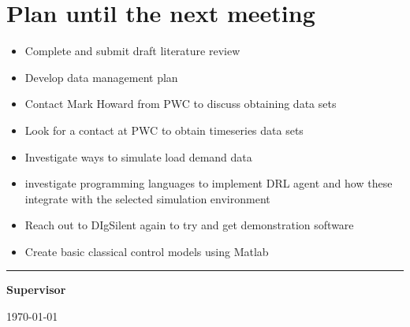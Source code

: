 \documentclass[12pt]{article}
\begin{document}
	\section{Plan until the next meeting}
	\begin{itemize}
		\item Complete and submit draft literature review
		\item Develop data management plan
		\item Contact Mark Howard from PWC to discuss obtaining data sets
		\item Look for a contact at PWC to obtain timeseries data sets
		\item Investigate ways to simulate load demand data
		\item investigate programming languages to implement DRL agent and how these integrate with the selected simulation environment
		\item Reach out to DIgSilent again to try and get demonstration software
		\item Create basic classical control models using Matlab
	\end{itemize}
	\par
	\vspace{\fill}%
	\noindent\rule{0.4\linewidth}{0.5pt}%
	\vspace{1em}%
	\par
	\noindent\textbf{Supervisor}\vspace{1em}%
	\par
	\noindent\today
\end{document}
